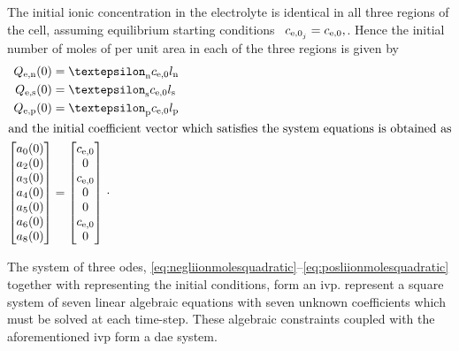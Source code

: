 \addlines
The  initial   ionic  concentration   in  the   electrolyte  is   identical  in
all  three  regions  of  the  cell,  assuming  equilibrium  starting  conditions
\ie~${c_{\text{e,0}_j}  = c_\text{e,0},  \jinnsp}$.  Hence the  initial number  of
moles of  per unit area in each of the three regions is given by
\begin{align}
    Q_\text{e,n}(0) & = \varepsilon_\text{n} c_\text{e,0} l_\text{n} \label{eq:Qeninit}\\
    Q_\text{e,s}(0) & = \varepsilon_\text{s} c_\text{e,0} l_\text{s}\\
    Q_\text{e,p}(0) & = \varepsilon_\text{p} c_\text{e,0} l_\text{p} \label{eq:Qepinit}\\
    \intertext{and the initial coefficient vector which satisfies the system
    equations is obtained as}
    \begin{bmatrix}
        a_0(0) \\
        a_2(0) \\
        a_3(0) \\
        a_4(0) \\
        a_5(0) \\
        a_6(0) \\
        a_8(0)
        \end{bmatrix} & = \begin{bmatrix}
        c_\text{e,0} \\
        0 \\
        c_\text{e,0} \\
        0 \\
        0 \\
        c_\text{e,0} \\
        0
    \end{bmatrix} \, \cdot \label{eq:coeffinit}
\end{align}

The             system             of             three             \glspl{ode},
\eqref{eq:negliionmolesquadratic}--\eqref{eq:posliionmolesquadratic}    together
with    representing the  initial  conditions,
form   an    \gls{ivp}.   
represent a square system of seven linear algebraic equations with seven unknown
coefficients which must be solved at each time-step. These algebraic constraints
coupled with the aforementioned \gls{ivp} form a \gls{dae} system.

